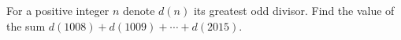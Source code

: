 \documentclass[varwidth]{standalone}
\begin{document}
    For a positive integer $n$ denote $d(n)$ its greatest odd divisor. Find the value of the sum $d(1008) + d(1009) + \dotsb + d(2015)$.
\end{document}
